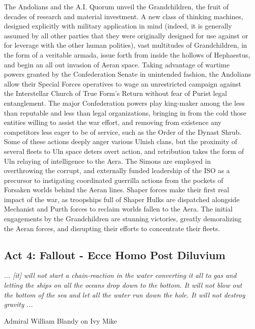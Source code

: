 The Andolians and the A.I. Quorum unveil the Grandchildren, the fruit
of decades of research and material investment. A new class of
thinking machines, designed explicitly with military application in
mind (indeed, it is generally assumed by all other parties that they
were originally designed for use against or for leverage with the
other human polities), vast multitudes of Grandchildren, in the form
of a veritable armada, issue forth from inside the hollows of
Hephaestus, and begin an all out invasion of Aeran space. Taking
advantage of wartime powers granted by the Confederation Senate in
unintended fashion, the Andolians allow their Special Forces
operatives to wage an unrestricted campaign against the Interstellar
Church of True Form's Return without fear of Purist legal
entanglement. The major Confederation powers play king-maker among the
less than reputable and less than legal organizations, bringing in
from the cold those entities willing to assist the war effort, and
removing from existence any competitors less eager to be of service,
such as the Order of the Dynast Shrub. Some of these actions deeply
anger various Ulnish clans, but the proximity of several fleets to Uln
space deters overt action, and retribution takes the form of Uln
relaying of intelligence to the Aera. The Simons are employed in
overthrowing the corrupt, and externally funded leadership of the ISO
as a precursor to instigating coordinated guerrilla actions from the
pockets of Forsaken worlds behind the Aeran lines. Shaper forces make
their first real impact of the war, as troopships full of Shaper Hulks
are dispatched alongside Mechanist and Purth forces to reclaim worlds
fallen to the Aera. The initial engagements by the Grandchildren are
stunning victories, greatly demoralizing the Aeran forces, and
disrupting their efforts to concentrate their fleets.

\subsection{Act 4: Fallout - Ecce Homo Post Diluvium}

\begin{center}
{\it ... [it] will not start a chain-reaction in the water converting it all to gas and letting the ships on all the oceans drop down to the bottom. It will not blow out the bottom of the sea and let all the water run down the hole. It will not destroy gravity ... } 

Admiral William Blandy on Ivy Mike
\end{center}

